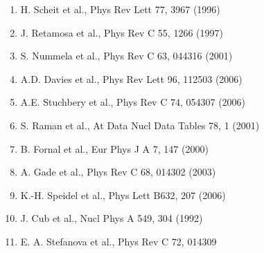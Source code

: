 \documentclass[prc]{revtex4}
\begin{document}
\begin{enumerate}
\item  H. Scheit et al., Phys Rev Lett 77, 3967 (1996) 
\item  J. Retamosa et al., Phys Rev C 55, 1266 (1997) 
\item  S. Nummela et al., Phys Rev C 63, 044316 (2001) 
\item A.D. Davies et al., Phys Rev Lett 96, 112503 (2006)
\item  A.E. Stuchbery et al., Phys Rev C 74, 054307 (2006)
\item  S. Raman et al., At Data Nucl Data Tables 78, 1 (2001)
\item  B. Fornal et al., Eur Phys J A 7, 147 (2000)
\item  A. Gade et al., Phys Rev C 68, 014302 (2003)
\item K.-H. Speidel et al., Phys Lett B632, 207 (2006)
\item J. Cub et al., Nucl Phys A 549, 304 (1992)
\item E. A. Stefanova et al., Phys Rev C 72, 014309 
\end{enumerate}
\end{document}
